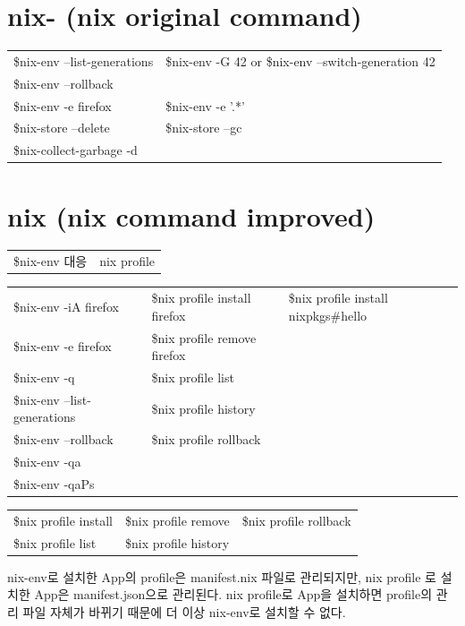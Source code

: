 \documentclass[a4paper,11pt]{article}
\author{Ryu Shinyoung}
\date{}
\title{}
\begin{document}
\section*{nix- (nix original command)}
\label{sec:org0908f8b}
\begin{center}
\begin{tabular}{ll}
\$nix-env --list-generations & \$nix-env -G 42  or \$nix-env --switch-generation 42\\
\$nix-env --rollback & \\
\$nix-env -e firefox & \$nix-env -e '.*'\\
\$nix-store --delete & \$nix-store --gc\\
\$nix-collect-garbage -d & \\
\end{tabular}
\end{center}
\section*{nix (nix command improved)}
\label{sec:org0327ce7}
\begin{center}
\begin{tabular}{ll}
\$nix-env 대응 & nix profile\\
\end{tabular}
\end{center}

\begin{center}
\begin{tabular}{lll}
\$nix-env -iA firefox & \$nix profile install firefox & \$nix profile install nixpkgs\#hello\\
\$nix-env -e firefox & \$nix profile remove firefox & \\
\$nix-env -q & \$nix profile list & \\
\$nix-env --list-generations & \$nix profile history & \\
\$nix-env --rollback & \$nix profile rollback & \\
\$nix-env -qa &  & \\
\$nix-env -qaPs &  & \\
\end{tabular}
\end{center}

\begin{center}
\begin{tabular}{lll}
\$nix profile install & \$nix profile remove & \$nix profile rollback\\
\$nix profile list & \$nix profile history & \\
\end{tabular}
\end{center}
nix-env로 설치한 App의 profile은  manifest.nix 파일로 관리되지만, nix profile 로 설치한 App은 manifest.json으로 관리된다.
nix profile로 App을 설치하면 profile의 관리 파일 자체가 바뀌기 때문에 더 이상 nix-env로 설치할 수 없다.
\end{document}
